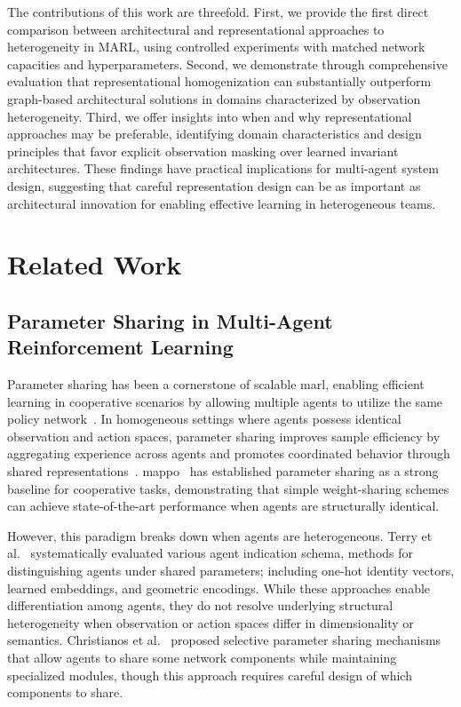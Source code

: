\documentclass[conference]{IEEEtran}
\begin{document}
The contributions of this work are threefold. 
First, we provide the first direct comparison between architectural and representational 
approaches to heterogeneity in MARL, using controlled experiments with matched network 
capacities and hyperparameters. 
Second, we demonstrate through comprehensive evaluation 
that representational homogenization can substantially outperform graph-based architectural 
solutions in domains characterized by observation heterogeneity. 
Third, we offer insights into when and why representational approaches may be preferable, 
identifying domain characteristics and design principles that favor explicit 
observation masking over learned invariant architectures. 
These findings have practical implications for multi-agent system design, 
suggesting that careful representation design can be as important as architectural 
innovation for enabling effective learning in heterogeneous teams.

\section{Related Work}

\subsection{Parameter Sharing in Multi-Agent Reinforcement Learning}

Parameter sharing has been a cornerstone of scalable \gls{marl}, 
enabling efficient learning in cooperative scenarios by allowing 
multiple agents to utilize the same policy network~\cite{gupta2017, foerster2018}. 
In homogeneous settings where agents possess identical observation and action spaces, 
parameter sharing improves sample efficiency by aggregating experience across agents 
and promotes coordinated behavior through shared representations~\cite{terry2020}. 
\Gls{mappo}~\cite{yu2022} has established parameter sharing as a 
strong baseline for cooperative tasks, demonstrating that simple weight-sharing 
schemes can achieve state-of-the-art performance when agents are structurally identical.

However, this paradigm breaks down when agents are heterogeneous. 
Terry et al.~\cite{terry2020} systematically evaluated various agent indication schema, 
methods for distinguishing agents under shared parameters; 
including one-hot identity vectors, learned embeddings, and geometric encodings. 
While these approaches enable differentiation among agents, 
they do not resolve underlying structural heterogeneity when 
observation or action spaces differ in dimensionality or semantics. 
Christianos et al.~\cite{christianos2021} proposed selective parameter sharing 
mechanisms that allow agents to share some network components while 
maintaining specialized modules, though this approach requires careful 
design of which components to share.
\end{document}
